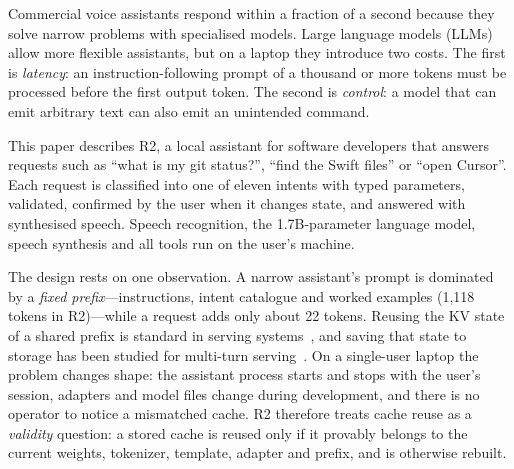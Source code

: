 \documentclass[10pt,twocolumn,letterpaper]{article}
\theoremstyle{definition}
\begin{document}
Commercial voice assistants respond within a fraction of a second because they solve narrow problems
with specialised models. Large language models (LLMs) allow more flexible assistants, but on a laptop
they introduce two costs. The first is \emph{latency}: an instruction-following prompt of a thousand
or more tokens must be processed before the first output token. The second is \emph{control}: a
model that can emit arbitrary text can also emit an unintended command.

This paper describes R2, a local assistant for software developers that answers requests such as
``what is my git status?'', ``find the Swift files'' or ``open Cursor''. Each request is classified
into one of eleven intents with typed parameters, validated, confirmed by the user when it changes
state, and answered with synthesised speech. Speech recognition, the 1.7B-parameter language model,
speech synthesis and all tools run on the user's machine.

The design rests on one observation. A narrow assistant's prompt is dominated by a \emph{fixed
prefix}---instructions, intent catalogue and worked examples (1{,}118 tokens in R2)---while a
request adds only about 22 tokens. Reusing the KV state of a shared prefix is standard in serving
systems~\cite{kwon2023pagedattention,zheng2024sglang,gim2024promptcache}, and saving that state to
storage has been studied for multi-turn serving~\cite{gao2024cachedattention,cheng2025lmcache}. On
a single-user laptop the problem changes shape: the assistant process starts and stops with the
user's session, adapters and model files change during development, and there is no operator to
notice a mismatched cache. R2 therefore treats cache reuse as a \emph{validity} question: a stored
cache is reused only if it provably belongs to the current weights, tokenizer, template, adapter
and prefix, and is otherwise rebuilt.
\end{document}
